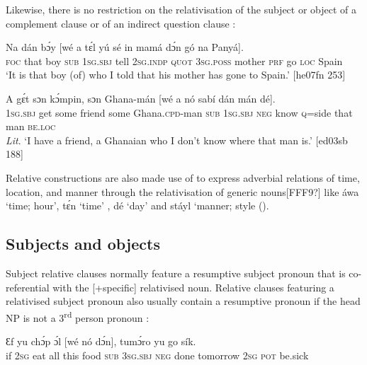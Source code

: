 Likewise, there is no restriction on the relativisation of the subject or object of a complement clause  or of an indirect question clause :


\ea%
    \label{ex:key:1428}
    \gll Na  dán  bɔ́y  [wé  a    tɛ́l  yú    sé    in    mamá  dɔ́n
gó  na  Panyá].\\
\textsc{foc}  that  boy   \textsc{sub}  \textsc{1sg.sbj}  tell  \textsc{2sg.indp}  \textsc{quot}    \textsc{3sg.poss}  mother  \textsc{prf}
go  \textsc{loc}  Spain\\

\glt ‘It is that boy (of) who I told that his mother has gone to Spain.’ [he07fn 253]
\z


\ea%
    \label{ex:key:1429}
    \gll A    gɛ́t  sɔn    kɔ́mpin,  sɔn    Ghana-mán    [wé  a    nó  sabí
  dán  mán    dé].\\
\textsc{1sg.sbj}  get  some  friend  some  Ghana\textsc{.cpd}{}-man   \textsc{sub}  \textsc{1sg.sbj}  \textsc{neg}  know
\textsc{q}=side  that  man    \textsc{be.loc}\\

\glt \textit{Lit}. ‘I have a friend, a Ghanaian who I don’t know where that man is.’ [ed03sb 188]
\z

Relative constructions are also made use of to express adverbial relations of time, location, and manner through the relativisation of generic nouns[FFF9?] like áwa ‘time; hour’, tɛ́n ‘time’ , dé ‘day’  and stáyl ‘manner; style ().

\subsection{Subjects and objects} \label{sec:10.6.2}

Subject relative clauses normally feature a resumptive subject pronoun that is co-referential with the [+specific] relativised noun. Relative clauses featuring a relativised subject pronoun also usually contain a resumptive pronoun if the head \textsc{NP} is not a 3\textsuperscript{rd} person pronoun :


\ea%
    \label{ex:key:1430}
    \gll Ɛf  yu  chɔ́p  ɔ́l      [wé      nó  dɔ́n],  tumɔ́ro
yu  go  sík.\\
if  \textsc{2sg}  eat    all  this  food    \textsc{sub}  \textsc{3sg.sbj}  \textsc{neg}  done  tomorrow
\textsc{2sg}  \textsc{pot}  be.sick\\

